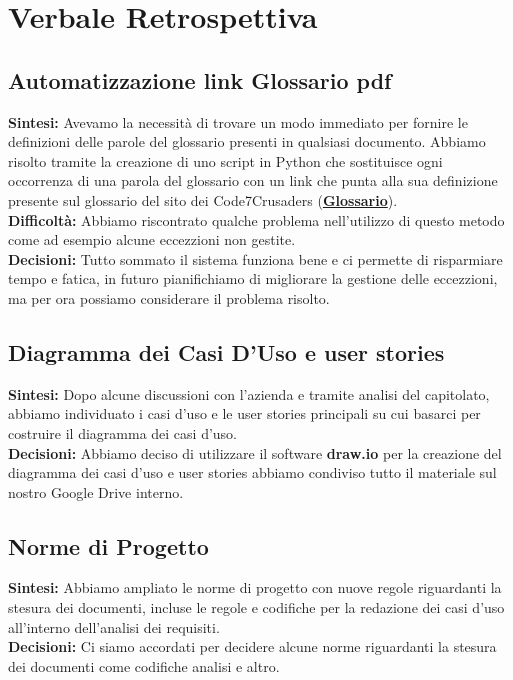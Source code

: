\documentclass{article}
\begin{document}
\newpage
\section{Verbale Retrospettiva}

    \subsection{Automatizzazione link Glossario pdf}
    \textbf{Sintesi:} Avevamo la necessità di trovare un modo immediato per fornire le definizioni delle parole del glossario presenti in qualsiasi documento. Abbiamo risolto tramite la creazione di uno script in Python che sostituisce ogni occorrenza di una parola del glossario con un link che punta alla sua definizione presente sul glossario del sito dei Code7Crusaders (\href{https://code7crusaders.github.io/docs/RTB/documentazione_interna/glossario.html}{\textbf{Glossario}}). \\
    \textbf{Difficoltà:} Abbiamo riscontrato qualche problema nell'utilizzo di questo metodo come ad esempio alcune eccezzioni non gestite. \\
    \textbf{Decisioni:} Tutto sommato il sistema funziona bene e ci permette di risparmiare tempo e fatica, in futuro pianifichiamo di migliorare la gestione delle eccezzioni, ma per ora possiamo considerare il problema risolto. 

    \subsection{Diagramma dei Casi D'Uso e user stories}
    \textbf{Sintesi:} Dopo alcune discussioni con l'azienda e tramite analisi del capitolato, abbiamo individuato i casi d'uso e le user stories principali su cui basarci per costruire il diagramma dei casi d'uso. \\
    \textbf{Decisioni:} Abbiamo deciso di utilizzare il software \textbf{draw.io} per la creazione del diagramma dei casi d'uso e user stories abbiamo condiviso tutto il materiale sul nostro Google Drive interno.

    \subsection{Norme di Progetto}
    \textbf{Sintesi:} Abbiamo ampliato le norme di progetto con nuove regole riguardanti la stesura dei documenti, incluse le regole e codifiche per la redazione dei casi d'uso all'interno dell'analisi dei requisiti. \\
    \textbf{Decisioni:} Ci siamo accordati per decidere alcune norme riguardanti la stesura dei documenti come codifiche analisi e altro.
    
\end{document}
